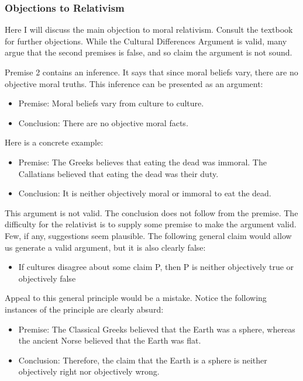 \documentclass[]{article}
\begin{document}
\subsubsection{Objections to Relativism}\label{objections-to-relativism}

Here I will discuss the main objection to moral relativism. Consult the
textbook for further objections. While the Cultural Differences Argument
is valid, many argue that the second premises is false, and so claim the
argument is not sound.

Premise 2 contains an inference. It says that since moral beliefs vary,
there are no objective moral truths. This inference can be presented as
an argument:

\begin{itemize}
\itemsep1pt\parskip0pt
\item
  Premise: Moral beliefs vary from culture to culture.
\item
  Conclusion: There are no objective moral facts.
\end{itemize}

Here is a concrete example:

\begin{itemize}
\itemsep1pt\parskip0pt
\item
  Premise: The Greeks believes that eating the dead was immoral. The
  Callatians believed that eating the dead was their duty.
\item
  Conclusion: It is neither objectively moral or immoral to eat the
  dead.
\end{itemize}

This argument is not valid. The conclusion does not follow from the
premise. The difficulty for the relativist is to supply some premise to
make the argument valid. Few, if any, suggestions seem plausible. The
following general claim would allow us generate a valid argument, but it
is also clearly false:

\begin{itemize}
\itemsep1pt\parskip0pt
\item
  If cultures disagree about some claim P, then P is neither objectively
  true or objectively false
\end{itemize}

Appeal to this general principle would be a mistake. Notice the
following instances of the principle are clearly absurd:

\begin{itemize}
\itemsep1pt\parskip0pt
\item
  Premise: The Classical Greeks believed that the Earth was a sphere,
  whereas the ancient Norse believed that the Earth was flat.
\item
  Conclusion: Therefore, the claim that the Earth is a sphere is neither
  objectively right nor objectively wrong.
\end{itemize}
\end{document}
